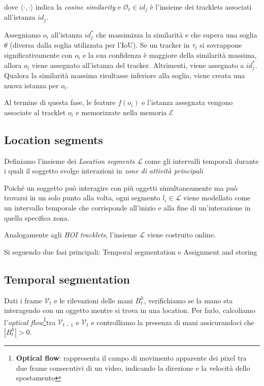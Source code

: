dove $\langle \cdot, \cdot \rangle$ indica la \emph{cosine similarity} e $\mathcal{O}_t \in id_j$ è l'insieme dei tracklets associati all'istanza $id_j$.  

Assegniamo $o_i$ all'istanza $id_j^*$ che massimizza la similarità e che supera una soglia $\theta$ (diversa dalla soglia utilizzata per l'IoU). Se un tracker in $\tau_t$ si sovrappone significativamente con $o_i$ e la sua confidenza è maggiore della similarità massima, allora $o_i$ viene assegnato all'istanza del tracker. Altrimenti, viene assegnato a $id_j^*$. Qualora la similarità massima risultasse inferiore alla soglia, viene creata una nuova istanza per $o_i$.  

Al termine di questa fase, le feature $f(o_i)$ e l'istanza assegnata vengono associate al tracklet $o_i$ e memorizzate nella memoria $\mathcal{E}$

\subsection{Location segments}
Definiamo l'insieme dei \emph{Location segments} $\mathcal{L}$ come gli intervalli temporali durante i quali il soggetto svolge interazioni in \emph{zone di attività principali}

Poiché un soggetto può interagire con più oggetti simultaneamente ma può trovarsi in un solo punto alla volta, ogni segmento $l_i \in \mathcal{L}$ viene modellato come un intervallo temporale che corrisponde all'inizio e alla fine di un'interazione in quella specifica zona.  

Analogamente agli \emph{HOI tracklets}, l'insieme $\mathcal{L}$ viene costruito online.

Si seguendo due fasi principali: Temporal segmentation e Assignment and storing

\subsection*{Temporal segmentation}
Dati i frame $\mathcal{V}_t$ e le rilevazioni delle mani $B_t^h$, verifichiamo se la mano sta interagendo con un oggetto mentre si trova in una location. Per farlo, calcoliamo l'\emph{optical flow}\footnote{\textbf{Optical flow}: rappresenta il campo di movimento apparente dei pixel tra due frame consecutivi di un video, indicando la direzione e la velocità dello spostamento}tra $\mathcal{V}_{t-1}$ e $\mathcal{V}_t$ e controlliamo la presenza di mani assicurandoci che $|B_t^h|>0$.

